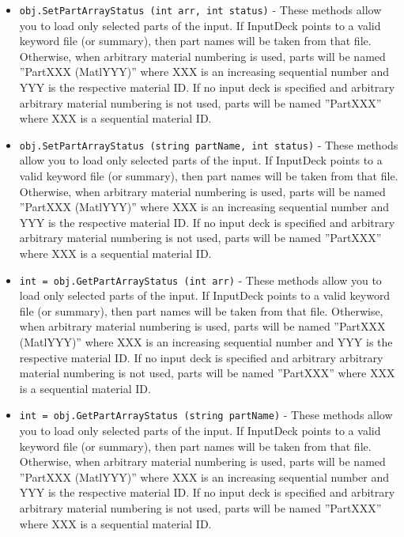 \begin{itemize}
\item  \verb|obj.SetPartArrayStatus (int arr, int status)| -  These methods allow you to load only selected parts of the input.
 If InputDeck points to a valid keyword file (or summary), then part
 names will be taken from that file.
 Otherwise, when arbitrary material numbering is used, parts will be named
 ''PartXXX (MatlYYY)'' where XXX is an increasing sequential number and YYY
 is the respective material ID. If no input deck is specified and arbitrary
 arbitrary material numbering is not used, parts will be named
 ''PartXXX'' where XXX is a sequential material ID.

\item  \verb|obj.SetPartArrayStatus (string partName, int status)| -  These methods allow you to load only selected parts of the input.
 If InputDeck points to a valid keyword file (or summary), then part
 names will be taken from that file.
 Otherwise, when arbitrary material numbering is used, parts will be named
 ''PartXXX (MatlYYY)'' where XXX is an increasing sequential number and YYY
 is the respective material ID. If no input deck is specified and arbitrary
 arbitrary material numbering is not used, parts will be named
 ''PartXXX'' where XXX is a sequential material ID.

\item  \verb|int = obj.GetPartArrayStatus (int arr)| -  These methods allow you to load only selected parts of the input.
 If InputDeck points to a valid keyword file (or summary), then part
 names will be taken from that file.
 Otherwise, when arbitrary material numbering is used, parts will be named
 ''PartXXX (MatlYYY)'' where XXX is an increasing sequential number and YYY
 is the respective material ID. If no input deck is specified and arbitrary
 arbitrary material numbering is not used, parts will be named
 ''PartXXX'' where XXX is a sequential material ID.

\item  \verb|int = obj.GetPartArrayStatus (string partName)| -  These methods allow you to load only selected parts of the input.
 If InputDeck points to a valid keyword file (or summary), then part
 names will be taken from that file.
 Otherwise, when arbitrary material numbering is used, parts will be named
 ''PartXXX (MatlYYY)'' where XXX is an increasing sequential number and YYY
 is the respective material ID. If no input deck is specified and arbitrary
 arbitrary material numbering is not used, parts will be named
 ''PartXXX'' where XXX is a sequential material ID.

\end{itemize}
